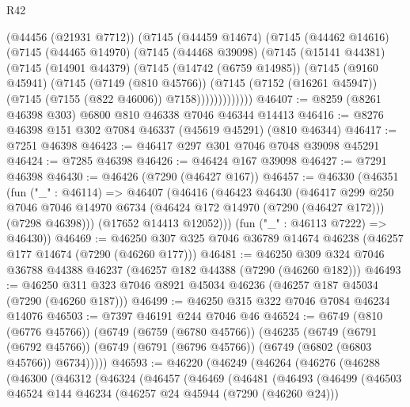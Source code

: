 \begin{lexlean}{R42}
\begin{coremodule}
{        (@44456 (@21931 @7712))
        (@7145
          (@44459 @14674)
          (@7145
            (@44462 @14616)
            (@7145
              (@44465 @14970)
              (@7145
                (@44468 @39098)
                (@7145
                  (@15141 @44381)
                  (@7145
                    (@14901 @44379)
                    (@7145
                      (@14742 (@6759 @14985))
                      (@7145
                        (@9160 @45941)
                        (@7145
                          (@7149 (@810 @45766))
                          (@7145
                            (@7152 (@16261 @45947))
                            (@7145 (@7155 (@822 @46006)) @7158)))))))))))))
@46407 := @8259 (@8261 @46398 @303) @6800 @810 @46338 @7046 @46344 @14413
@46416 := @8276 @46398 @151 @302 @7084 @46337 (@45619 @45291) (@810 @46344)
@46417 := @7251 @46398
@46423 := @46417 @297 @301 @7046 @7048 @39098 @45291
@46424 := @7285 @46398
@46426 := @46424 @167 @39098
@46427 := @7291 @46398
@46430 := @46426 (@7290 (@46427 @167))
@46457 := @46330
    (@46351
      (fun ("_" : @46114) =>
      @46407
        (@46416
          (@46423
            @46430
            (@46417
              @299
              @250
              @7046
              @7046
              @14970
              @6734
              (@46424 @172 @14970 (@7290 (@46427 @172)))
              (@7298 @46398)))
          (@17652 @14413 @12052)))
      (fun ("_" : @46113 @7222) => @46430))
@46469 := @46250 @307 @325 @7046 @36789 @14674 @46238 (@46257 @177 @14674 (@7290 (@46260 @177)))
@46481 := @46250 @309 @324 @7046 @36788 @44388 @46237 (@46257 @182 @44388 (@7290 (@46260 @182)))
@46493 := @46250 @311 @323 @7046 @8921 @45034 @46236 (@46257 @187 @45034 (@7290 (@46260 @187)))
@46499 := @46250 @315 @322 @7046 @7084 @46234 @14076
@46503 := @7397 @46191 @244 @7046 @46
@46524 := @6749
    (@810 (@6776 @45766))
    (@6749
      (@6759 (@6780 @45766))
      (@46235
        (@6749
          (@6791 (@6792 @45766))
          (@6749 (@6791 (@6796 @45766)) (@6749 (@6802 (@6803 @45766)) @6734)))))
@46593 := @46220
    (@46249
      (@46264
        (@46276
          (@46288
            (@46300
              (@46312
                (@46324
                  (@46457
                    (@46469
                      (@46481
                        (@46493
                          (@46499
                            (@46503
                              @46524
                              @144
                              @46234
                              (@46257 @24 @45944 (@7290 (@46260 @24)))
}
\end{coremodule}
\end{lexlean}
